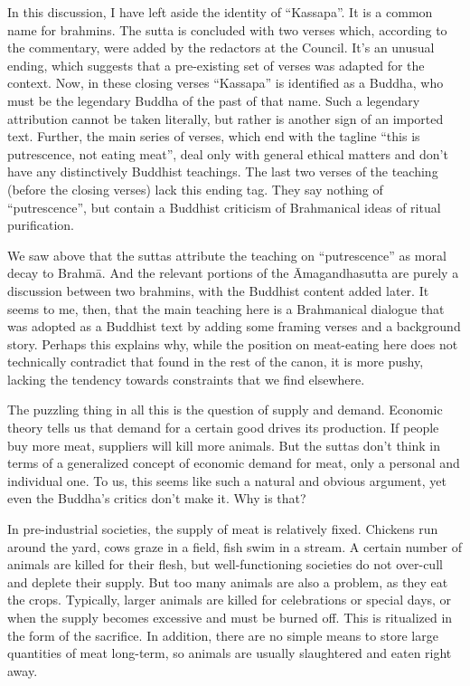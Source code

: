 \documentclass[12pt,openany]{book}%
\begin{document}
In this discussion, I have left aside the identity of “Kassapa”. It is a common name for brahmins. The sutta is concluded with two verses which, according to the commentary, were added by the redactors at the Council. It’s an unusual ending, which suggests that a pre-existing set of verses was adapted for the context. Now, in these closing verses “Kassapa” is identified as a Buddha, who must be the legendary Buddha of the past of that name. Such a legendary attribution cannot be taken literally, but rather is another sign of an imported text. Further, the main series of verses, which end with the tagline “this is putrescence, not eating meat”, deal only with general ethical matters and don’t have any distinctively Buddhist teachings. The last two verses of the teaching (before the closing verses) lack this ending tag. They say nothing of “putrescence”, but contain a Buddhist criticism of Brahmanical ideas of ritual purification.

We saw above that the suttas attribute the teaching on “putrescence” as moral decay to \textsanskrit{Brahmā}. And the relevant portions of the Āmagandhasutta are purely a discussion between two brahmins, with the Buddhist content added later. It seems to me, then, that the main teaching here is a Brahmanical dialogue that was adopted as a Buddhist text by adding some framing verses and a background story. Perhaps this explains why, while the position on meat-eating here does not technically contradict that found in the rest of the canon, it is more pushy, lacking the tendency towards constraints that we find elsewhere.

The puzzling thing in all this is the question of supply and demand. Economic theory tells us that demand for a certain good drives its production. If people buy more meat, suppliers will kill more animals. But the suttas don’t think in terms of a generalized concept of economic demand for meat, only a personal and individual one. To us, this seems like such a natural and obvious argument, yet even the Buddha’s critics don’t make it. Why is that?

In pre-industrial societies, the supply of meat is relatively fixed. Chickens run around the yard, cows graze in a field, fish swim in a stream. A certain number of animals are killed for their flesh, but well-functioning societies do not over-cull and deplete their supply. But too many animals are also a problem, as they eat the crops. Typically, larger animals are killed for celebrations or special days, or when the supply becomes excessive and must be burned off. This is ritualized in the form of the sacrifice. In addition, there are no simple means to store large quantities of meat long-term, so animals are usually slaughtered and eaten right away.
\end{document}
